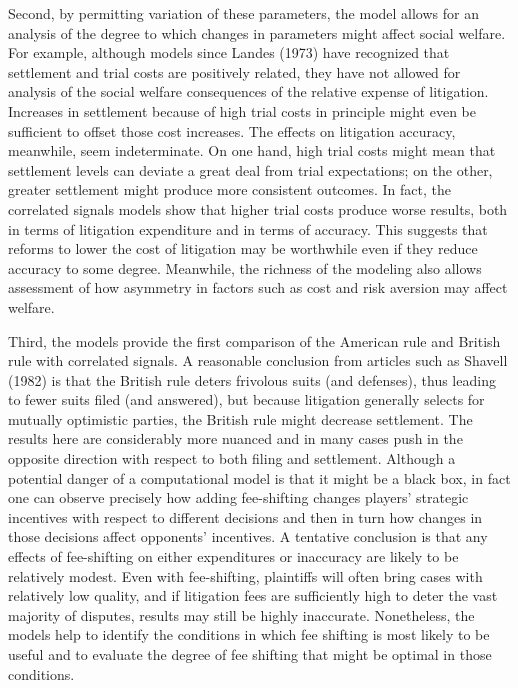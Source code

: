 \documentclass{article}
\begin{document}
Second, by permitting variation of these parameters, the model allows for an analysis of the degree to which changes in parameters might affect social welfare. For example, although models since Landes (1973) have recognized that settlement and trial costs are positively related, they have not allowed for analysis of the social welfare consequences of the relative expense of litigation. Increases in settlement because of high trial costs in principle might even be sufficient to offset those cost increases. The effects on litigation accuracy, meanwhile, seem indeterminate. On one hand, high trial costs might mean that settlement levels can deviate a great deal from trial expectations; on the other, greater settlement might produce more consistent outcomes. In fact, the correlated signals models show that higher trial costs produce worse results, both in terms of litigation expenditure and in terms of accuracy. This suggests that reforms to lower the cost of litigation may be worthwhile even if they reduce accuracy to some degree. Meanwhile, the richness of the modeling also allows assessment of how asymmetry in factors such as cost and risk aversion may affect welfare. 

Third, the models provide the first comparison of the American rule and British rule with correlated signals. A reasonable conclusion from articles such as Shavell (1982) is that the British rule deters frivolous suits (and defenses), thus leading to fewer suits filed (and answered), but because litigation generally selects for mutually optimistic parties, the British rule might decrease settlement. The results here are considerably more nuanced and in many cases push in the opposite direction with respect to both filing and settlement. Although a potential danger of a computational model is that it might be a black box, in fact one can observe precisely how adding fee-shifting changes players' strategic incentives with respect to different decisions and then in turn how changes in those decisions affect opponents' incentives. A tentative conclusion is that any effects of fee-shifting on either expenditures or inaccuracy are likely to be relatively modest. Even with fee-shifting, plaintiffs will often bring cases with relatively low quality, and if litigation fees are sufficiently high to deter the vast majority of disputes, results may still be highly inaccurate. Nonetheless, the models help to identify the conditions in which fee shifting is most likely to be useful and to evaluate the degree of fee shifting that might be optimal in those conditions.
\end{document}

